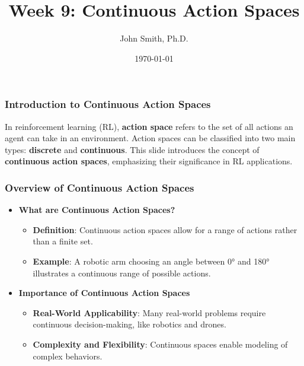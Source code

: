 \documentclass[aspectratio=169]{beamer}
\title[Continuous Action Spaces]{Week 9: Continuous Action Spaces}
\author[J. Smith]{John Smith, Ph.D.}
\institute[University Name]{
  Department of Computer Science\\
  University Name\\
  \vspace{0.3cm}
  Email: email@university.edu\\
  Website: www.university.edu
}
\date{\today}
\begin{document}
\frame{\titlepage}

\begin{frame}[fragile]
    \frametitle{Introduction to Continuous Action Spaces}
    In reinforcement learning (RL), \textbf{action space} refers to the set of all actions an agent can take in an environment. Action spaces can be classified into two main types: \textbf{discrete} and \textbf{continuous}. This slide introduces the concept of \textbf{continuous action spaces}, emphasizing their significance in RL applications.
\end{frame}

\begin{frame}[fragile]
    \frametitle{Overview of Continuous Action Spaces}
    \begin{itemize}
        \item \textbf{What are Continuous Action Spaces?}
            \begin{itemize}
                \item \textbf{Definition}: Continuous action spaces allow for a range of actions rather than a finite set.
                \item \textbf{Example}: A robotic arm choosing an angle between 0° and 180° illustrates a continuous range of possible actions.
            \end{itemize}

        \item \textbf{Importance of Continuous Action Spaces}
            \begin{itemize}
                \item \textbf{Real-World Applicability}: Many real-world problems require continuous decision-making, like robotics and drones.
                \item \textbf{Complexity and Flexibility}: Continuous spaces enable modeling of complex behaviors.
            \end{itemize}
    \end{itemize}
\end{frame}
\end{document}
